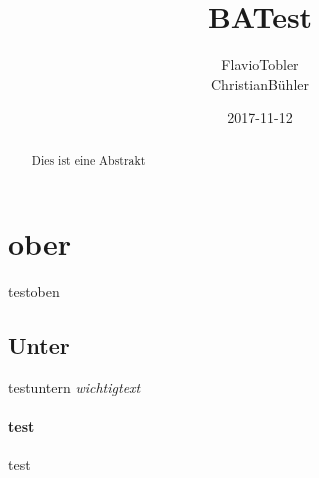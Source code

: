 \documentclass[final]{article}
\begin{document}
	\title{BATest}
	\author{FlavioTobler \\ ChristianBühler}
	\date{2017-11-12}
	\begin{titlepage}
		\maketitle
	\end{titlepage}
	\begin{abstract}
		Dies ist eine Abstrakt
	\end{abstract}
	\section{ober}
	testoben
	\subsection{Unter}
	\huge 
	testuntern \em wichtigtext \em
	\paragraph{test}
	test
	
	
	
\end{document}
